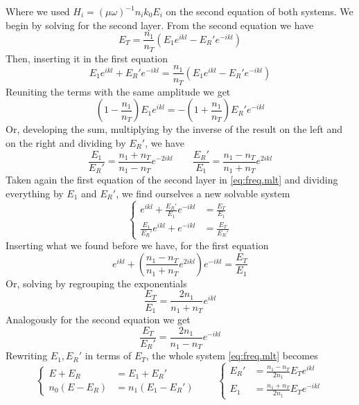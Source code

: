 \documentclass[../electromagnetism.tex]{subfiles}
\begin{document}
Where we used $H_i=(\mu\omega)^{-1}n_ik_0E_i$ on the second equation of both systems.
We begin by solving for the second layer. From the second equation we have
\begin{equation*}
	E_T=\frac{n_1}{n_T}\left( E_1e^{ikl}-E_R'e^{-ikl} \right)
\end{equation*}
Then, inserting it in the first equation
\begin{equation*}
	E_1e^{ikl}+E_R'e^{-ikl}=\frac{n_1}{n_T}\left( E_1e^{ikl}-E_R'e^{-ikl} \right)
\end{equation*}
Reuniting the terms with the same amplitude we get
\begin{equation*}
	\left( 1-\frac{n_1}{n_T} \right)E_1e^{ikl}=-\left( 1+\frac{n_1}{n_T} \right)E_R'e^{-ikl}
\end{equation*}
Or, developing the sum, multiplying by the inverse of the result on the left and on the right and dividing by $E_R'$, we have
\begin{equation*}
	\frac{E_1}{E_R'}=\frac{n_1+n_T}{n_1-n_T}e^{-2ikl}\qquad\frac{E_R'}{E_1}=\frac{n_1-n_T}{n_1+n_T}e^{2ikl}
\end{equation*}
Taken again the first equation of the second layer in \eqref{eq:freq.mlt} and dividing everything by $E_1$ and $E_R'$, we find ourselves a new solvable system
\begin{equation*}
	\left\{\begin{aligned}
		e^{ikl}+\frac{E_R'}{E_1}e^{-ikl}&= \frac{E_T}{E_1}\\
		\frac{E_1}{E_R'}e^{ikl}+e^{-ikl}&= \frac{E_T}{E_R'}
	\end{aligned}\right.
\end{equation*}
Inserting what we found before we have, for the first equation
\begin{equation*}
	e^{ikl}+\left( \frac{n_1-n_T}{n_1+n_T}e^{2ikl} \right)e^{-ikl}=\frac{E_T}{E_1}
\end{equation*}
Or, solving by regrouping the exponentials
\begin{equation*}
	\frac{E_T}{E_1}=\frac{2n_1}{n_1+n_T}e^{ikl}
\end{equation*}
Analogously for the second equation we get
\begin{equation*}
	\frac{E_T}{E_R'}=\frac{2n_1}{n_1-n_T}e^{-ikl}
\end{equation*}
Rewriting $E_1, E_R'$ in terms of $E_T$, the whole system \eqref{eq:freq.mlt} becomes
\begin{equation}
	\left\{ \begin{aligned}
		E+E_R&= E_1+E_R'\\
		n_0\left( E-E_R \right)&= n_1\left( E_1-E_R' \right)
	\end{aligned}\right.
	\qquad
	\left\{ \begin{aligned}
			E_R'&= \frac{n_1-n_T}{2n_1}E_Te^{ikl}\\
			E_1&= \frac{n_1+n_T}{2n_1}E_Te^{-ikl}
	\end{aligned}\right.
	\label{eq:almostsolved.mlt}
\end{equation}
\end{document}
